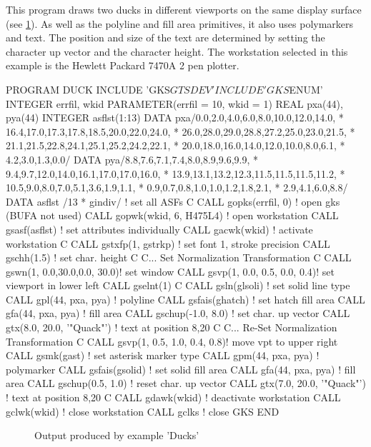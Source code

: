 This program draws two ducks in different viewports on the same display
surface (see \ref{fig:ducks}). As well as the polyline and fill area
primitives, it also uses polymarkers and text. The position and size of the
text are determined by setting the character up vector and the
character height. The workstation selected in this example is the
Hewlett Packard 7470A 2 pen plotter.
\begin{XMP}
      PROGRAM   DUCK
      INCLUDE  'GKS$GTSDEV'
      INCLUDE  'GKS$ENUM'
      INTEGER   errfil, wkid
      PARAMETER(errfil = 10, wkid = 1)
      REAL      pxa(44), pya(44)
      INTEGER   asflst(1:13)
      DATA      pxa/0.0,2.0,4.0,6.0,8.0,10.0,12.0,14.0,
     *              16.4,17.0,17.3,17.8,18.5,20.0,22.0,24.0,
     *              26.0,28.0,29.0,28.8,27.2,25.0,23.0,21.5,
     *              21.1,21.5,22.8,24.1,25.1,25.2,24.2,22.1,
     *              20.0,18.0,16.0,14.0,12.0,10.0,8.0,6.1,
     *              4.2,3.0,1.3,0.0/
      DATA      pya/8.8,7.6,7.1,7.4,8.0,8.9,9.6,9.9,
     *              9.4,9.7,12.0,14.0,16.1,17.0,17.0,16.0,
     *              13.9,13.1,13.2,12.3,11.5,11.5,11.5,11.2,
     *              10.5,9.0,8.0,7.0,5.1,3.6,1.9,1.1,
     *              0.9,0.7,0.8,1.0,1.0,1.2,1.8,2.1,
     *              2.9,4.1,6.0,8.8/
      DATA      asflst /13 * gindiv/  ! set all ASFs
C
      CALL gopks(errfil, 0)           ! open gks (BUFA not used)
      CALL gopwk(wkid, 6, H475L4)     ! open workstation
      CALL gsasf(asflst)              ! set attributes individually
      CALL gacwk(wkid)                ! activate workstation
C
      CALL gstxfp(1, gstrkp)          ! set font 1, stroke precision
      CALL gschh(1.5)                 ! set char. height
C
C...  Set Normalization Transformation
C
      CALL gswn(1, 0.0,30.0,0.0, 30.0)! set window
      CALL gsvp(1, 0.0, 0.5, 0.0, 0.4)! set viewport in lower left
      CALL gselnt(1)
C
      CALL gsln(glsoli)               ! set solid line type
      CALL gpl(44, pxa, pya)          ! polyline
      CALL gsfais(ghatch)             ! set hatch fill area
      CALL gfa(44, pxa, pya)          ! fill area
      CALL gschup(-1.0, 8.0)          ! set char. up vector
      CALL gtx(8.0, 20.0, '"Quack"')  ! text at position 8,20
C
C...  Re-Set Normalization Transformation
C
      CALL gsvp(1, 0.5, 1.0, 0.4, 0.8)! move vpt to upper right
      CALL gsmk(gast)                 ! set asterisk marker type
      CALL gpm(44, pxa, pya)          ! polymarker
      CALL gsfais(gsolid)             ! set solid fill area
      CALL gfa(44, pxa, pya)          ! fill area
      CALL gschup(0.5, 1.0)           ! reset char. up vector
      CALL gtx(7.0, 20.0, '"Quack"')  ! text at position 8,20
C
      CALL gdawk(wkid)                ! deactivate workstation
      CALL gclwk(wkid)                ! close workstation
      CALL gclks                      ! close GKS
      END
\end{XMP}
\begin{figure}[h]
\caption{Output produced by example 'Ducks'}
\label{fig:ducks}
\end{figure}
